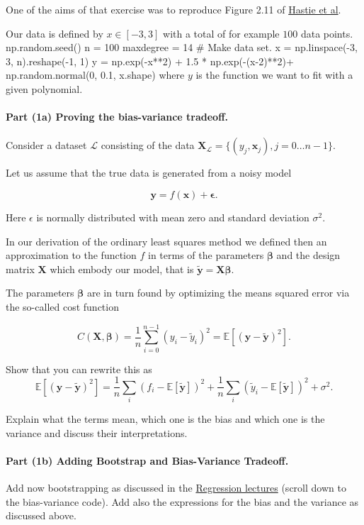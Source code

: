 \documentclass[%
oneside,                 %
final,                   %
10pt]{article}
\begin{document}
One of the aims of that exercise was 
to reproduce Figure 2.11 of \href{{https://github.com/CompPhysics/MLErasmus/blob/master/doc/Textbooks/elementsstat.pdf}}{Hastie et al}.

Our data is defined by $x\in [-3,3]$ with a total of for example $100$ data points.
\bpycod
np.random.seed()
n = 100
maxdegree = 14
# Make data set.
x = np.linspace(-3, 3, n).reshape(-1, 1)
y = np.exp(-x**2) + 1.5 * np.exp(-(x-2)**2)+ np.random.normal(0, 0.1, x.shape)
\epycod
where $y$ is the function we want to fit with a given polynomial.

\paragraph{Part (1a) Proving the bias-variance tradeoff.}
Consider a
dataset $\mathcal{L}$ consisting of the data
$\mathbf{X}_\mathcal{L}=\{(y_j, \boldsymbol{x}_j), j=0\ldots n-1\}$.

Let us assume that the true data is generated from a noisy model

\[
\bm{y}=f(\boldsymbol{x}) + \bm{\epsilon}.
\]

Here $\epsilon$ is normally distributed with mean zero and standard
deviation $\sigma^2$.

In our derivation of the ordinary least squares method we defined then
an approximation to the function $f$ in terms of the parameters
$\bm{\beta}$ and the design matrix $\bm{X}$ which embody our model,
that is $\bm{\tilde{y}}=\bm{X}\bm{\beta}$.

The parameters $\bm{\beta}$ are in turn found by optimizing the means
squared error via the so-called cost function

\[
C(\bm{X},\bm{\beta}) =\frac{1}{n}\sum_{i=0}^{n-1}(y_i-\tilde{y}_i)^2=\mathbb{E}\left[(\bm{y}-\bm{\tilde{y}})^2\right].
\]

Show that you can rewrite  this as
\[
\mathbb{E}\left[(\bm{y}-\bm{\tilde{y}})^2\right]=\frac{1}{n}\sum_i(f_i-\mathbb{E}\left[\bm{\tilde{y}}\right])^2+\frac{1}{n}\sum_i(\tilde{y}_i-\mathbb{E}\left[\bm{\tilde{y}}\right])^2+\sigma^2.
\]

Explain what the terms mean, which one is the bias and which one is
the variance and discuss their interpretations.


\paragraph{Part (1b) Adding Bootstrap and Bias-Variance Tradeoff.}
Add now bootstrapping as discussed in the \href{{https://compphysics.github.io/MLErasmus/doc/pub/Regression/html/Regression.html}}{Regression lectures} (scroll down to the bias-variance code).
Add also the expressions for the bias and the variance as discussed above.
\end{document}
